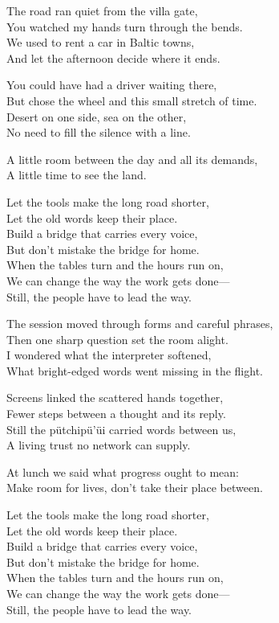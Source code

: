 \begin{lyrics}
The road ran quiet from the villa gate,\\
You watched my hands turn through the bends.\\
We used to rent a car in Baltic towns,\\
And let the afternoon decide where it ends.

You could have had a driver waiting there,\\
But chose the wheel and this small stretch of time.\\
Desert on one side, sea on the other,\\
No need to fill the silence with a line.

A little room between the day and all its demands,\\
A little time to see the land.

Let the tools make the long road shorter,\\
Let the old words keep their place.\\
Build a bridge that carries every voice,\\
But don’t mistake the bridge for home.\\
When the tables turn and the hours run on,\\
We can change the way the work gets done—\\
Still, the people have to lead the way.

The session moved through forms and careful phrases,\\
Then one sharp question set the room alight.\\
I wondered what the interpreter softened,\\
What bright-edged words went missing in the flight.

Screens linked the scattered hands together,\\
Fewer steps between a thought and its reply.\\
Still the pütchipü'üi carried words between us,\\
A living trust no network can supply.

At lunch we said what progress ought to mean:\\
Make room for lives, don’t take their place between.

Let the tools make the long road shorter,\\
Let the old words keep their place.\\
Build a bridge that carries every voice,\\
But don’t mistake the bridge for home.\\
When the tables turn and the hours run on,\\
We can change the way the work gets done—\\
Still, the people have to lead the way.


\end{lyrics}
